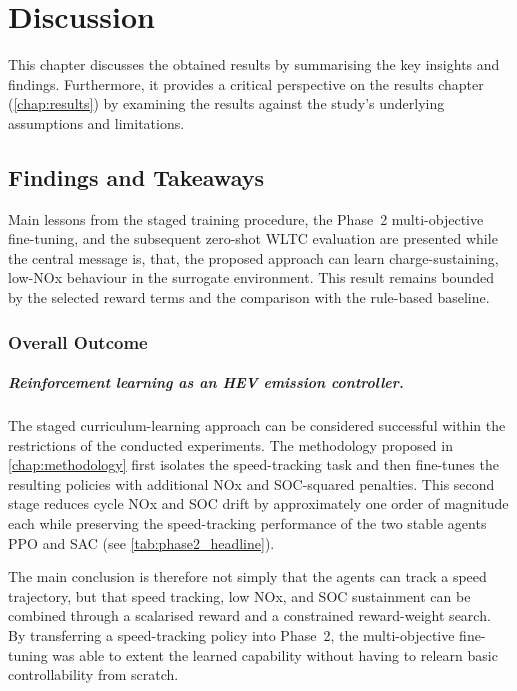 \chapter{Discussion}
\label{chap:discussion}

This chapter discusses the obtained results by summarising the key insights and findings. Furthermore, it provides a critical perspective on the results chapter (\autoref{chap:results}) by examining the results against the study's underlying assumptions and limitations.

\section{Findings and Takeaways}
\label{sec:findings_takeaways}

Main lessons from the staged training procedure, the Phase~2 multi-objective fine-tuning, and the subsequent zero-shot WLTC evaluation are presented while the central message is, that, the proposed approach can learn charge-sustaining, low-\ac{NOx} behaviour in the surrogate environment. This result remains bounded by the selected reward terms and the comparison with the rule-based baseline.

\subsection{Overall Outcome}


\paragraph{Reinforcement learning as an HEV emission controller.}
The staged curriculum-learning approach can be considered successful within the restrictions of the conducted experiments. The methodology proposed in \autoref{chap:methodology} first isolates the speed-tracking task and then fine-tunes the resulting policies with additional \ac{NOx} and \ac{SOC}-squared penalties. This second stage reduces cycle \ac{NOx} and \ac{SOC} drift by approximately one order of magnitude each while preserving the speed-tracking performance of the two stable agents \ac{PPO} and \ac{SAC} (see \autoref{tab:phase2_headline}).

The main conclusion is therefore not simply that the agents can track a speed trajectory, but that speed tracking, low \ac{NOx}, and \ac{SOC} sustainment can be combined through a scalarised reward and a constrained reward-weight search. By transferring a speed-tracking policy into Phase~2, the multi-objective fine-tuning was able to extent the learned capability without having to relearn basic controllability from scratch.

